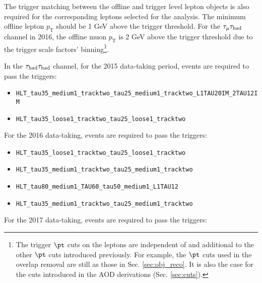 The trigger matching between the offline and trigger level lepton objects is also required for the corresponding leptons selected for the analysis. The minimum offline lepton $p_{\text{T}}$ should be 1 GeV above the trigger threshold. For the $\tau_\mu{}\tau_\text{had}$ channel in 2016, the offline muon $p_{\text{T}}$ is 2 GeV above the trigger threshold due to the trigger scale factors' binning\footnote{The trigger $\pt$ cuts on the leptons are independent of and additional to the other $\pt$ cuts introduced previously. For example, the $\pt$ cuts used in the overlap removal are still as those in Sec. \ref{sec:obj_reco}. It is also the case for the cuts introduced in the AOD derivations (Sec. \ref{sec:cuts}).}.

In the $\tau_\text{had}{}\tau_\text{had}$ channel, for the 2015 data-taking period, events are required to pass the triggers:

\begin{itemize}
  \item \texttt{HLT\_tau35\_medium1\_tracktwo\_tau25\_medium1\_tracktwo\_L1TAU20IM\_2TAU12IM}

  \item \texttt{HLT\_tau35\_loose1\_tracktwo\_tau25\_loose1\_tracktwo}
\end{itemize}

For the 2016 data-taking, events are required to pass the triggers:

\begin{itemize}
  \item \texttt{HLT\_tau35\_loose1\_tracktwo\_tau25\_loose1\_tracktwo}

  \item \texttt{HLT\_tau35\_medium1\_tracktwo\_tau25\_medium1\_tracktwo}

  \item \texttt{HLT\_tau80\_medium1\_TAU60\_tau50\_medium1\_L1TAU12}

  \item \texttt{HLT\_tau35\_medium1\_tracktwo\_tau25\_medium1\_tracktwo}
\end{itemize}

For the 2017 data-taking, events are required to pass the triggers:

